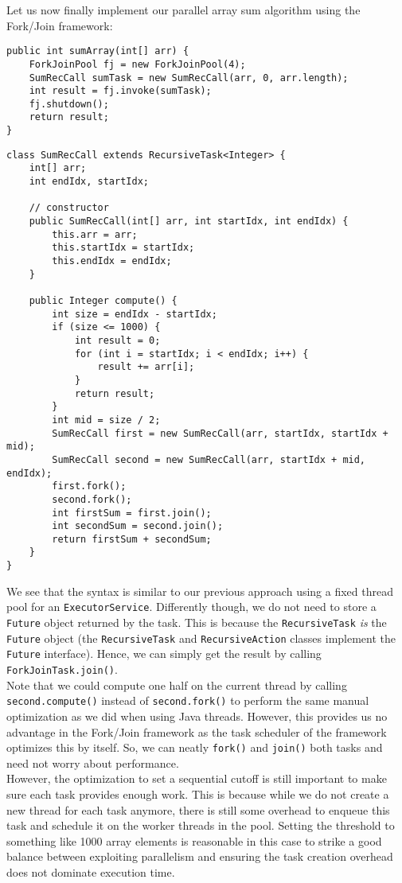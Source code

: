 \documentclass[main.tex]{subfiles}
\begin{document}
\noindent Let us now finally implement our parallel array sum algorithm using the Fork/Join framework:

\begin{verbatim}
public int sumArray(int[] arr) {
    ForkJoinPool fj = new ForkJoinPool(4);
    SumRecCall sumTask = new SumRecCall(arr, 0, arr.length);
    int result = fj.invoke(sumTask);
    fj.shutdown();
    return result;
}
\end{verbatim}

\begin{verbatim}
class SumRecCall extends RecursiveTask<Integer> {
    int[] arr;
    int endIdx, startIdx;

    // constructor
    public SumRecCall(int[] arr, int startIdx, int endIdx) {
        this.arr = arr;
        this.startIdx = startIdx;
        this.endIdx = endIdx;
    }

    public Integer compute() {
        int size = endIdx - startIdx;
        if (size <= 1000) {
            int result = 0;
            for (int i = startIdx; i < endIdx; i++) {
                result += arr[i];
            }
            return result;
        }
        int mid = size / 2;
        SumRecCall first = new SumRecCall(arr, startIdx, startIdx + mid);
        SumRecCall second = new SumRecCall(arr, startIdx + mid, endIdx);
        first.fork();
        second.fork();
        int firstSum = first.join();
        int secondSum = second.join();
        return firstSum + secondSum;
    }
}
\end{verbatim}

\noindent We see that the syntax is similar to our previous approach using a fixed thread pool for an \texttt{ExecutorService}. Differently though, we do not need to store a \texttt{Future} object returned by the task. This is because the \texttt{RecursiveTask} \textit{is} the \texttt{Future} object (the \texttt{RecursiveTask} and \texttt{RecursiveAction} classes implement the \texttt{Future} interface). Hence, we can simply get the result by calling \texttt{ForkJoinTask.join()}.\\[3mm]
Note that we could compute one half on the current thread by calling \texttt{second.compute()} instead of \texttt{second.fork()} to perform the same manual optimization as we did when using Java threads. However, this provides us no advantage in the Fork/Join framework as the task scheduler of the framework optimizes this by itself. So, we can neatly \texttt{fork()} and \texttt{join()} both tasks and need not worry about performance.\\
However, the optimization to set a sequential cutoff is still important to make sure each task provides enough work. This is because while we do not create a new thread for each task anymore, there is still some overhead to enqueue this task and schedule it on the worker threads in the pool. Setting the threshold to something like 1000 array elements is reasonable in this case to strike a good balance between exploiting parallelism and ensuring the task creation overhead does not dominate execution time.
\end{document}
